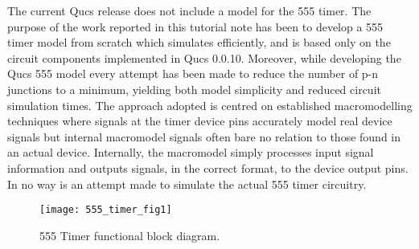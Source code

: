 \addvspace{12pt}

The current Qucs release does not include a model for the 555 timer.  The purpose of the work reported in this tutorial note has been to develop a 555 timer model from scratch which simulates efficiently, and is based only on the circuit components implemented in Qucs 0.0.10.  Moreover, while developing the Qucs 555 model every attempt has been made to reduce the number of p-n junctions to a minimum, yielding both model simplicity and reduced circuit simulation times.  The approach adopted is centred on established macromodelling techniques where signals at the timer device pins accurately model real device signals but internal macromodel signals often bare no relation to those found in an actual device.  Internally, the macromodel simply processes input signal information and outputs signals, in the correct format, to the device output pins.  In no way is an attempt made to simulate the actual 555 timer circuitry.

\begin{figure}[ht]
  \centering
  \texttt{[image: 555\_timer\_fig1]}
  \caption{555 Timer functional block diagram.}
  \label{fig:555_timer_fig1}
\end{figure} 


